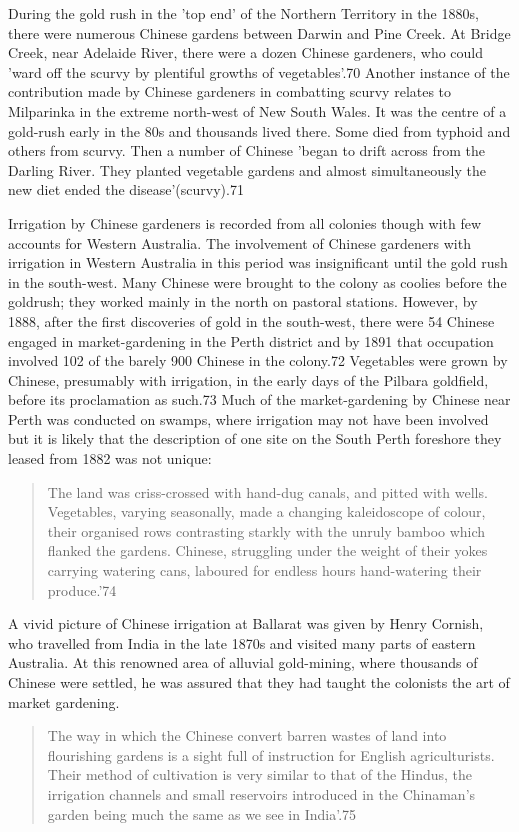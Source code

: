 During the gold rush in the 'top end' of the Northern Territory in the
1880s, there were numerous Chinese gardens between Darwin and Pine
Creek. At Bridge Creek, near Adelaide River, there were a dozen
Chinese gardeners, who could 'ward off the scurvy by plentiful growths
of vegetables'.70 Another instance of the contribution made by Chinese
gardeners in combatting scurvy relates to Milparinka in the extreme
north-west of New South Wales. It was the centre of a gold-rush early
in the 80s and thousands lived there. Some died from typhoid and
others from scurvy. Then a number of Chinese 'began to drift across
from the Darling River. They planted vegetable gardens and almost
simultaneously the new diet ended the disease'(scurvy).71

Irrigation by Chinese gardeners is recorded from all colonies though
with few accounts for Western Australia. The involvement of Chinese
gardeners with irrigation in Western Australia in this period was
insignificant until the gold rush in the south-west. Many Chinese were
brought to the colony as coolies before the goldrush; they worked
mainly in the north on pastoral stations. However, by 1888, after the
first discoveries of gold in the south-west, there were 54 Chinese
engaged in market-gardening in the Perth district and by 1891 that
occupation involved 102 of the barely 900 Chinese in the colony.72
Vegetables were grown by Chinese, presumably with irrigation, in the
early days of the Pilbara goldfield, before its proclamation as
such.73 Much of the market-gardening by Chinese near Perth was
conducted on swamps, where irrigation may not have been involved but
it is likely that the description of one site on the South Perth
foreshore they leased from 1882 was not unique:
\begin{quote}
	The land was criss-crossed with hand-dug canals, and pitted
	with wells.  Vegetables, varying seasonally, made a changing
	kaleidoscope of colour, their organised rows contrasting
	starkly with the unruly bamboo which flanked the
	gardens. Chinese, struggling under the weight of their yokes
	carrying watering cans, laboured for endless hours
	hand-watering their produce.'74
\end{quote}

A vivid picture of Chinese irrigation at Ballarat was given by Henry
Cornish, who travelled from India in the late 1870s and visited many
parts of eastern Australia. At this renowned area of alluvial
gold-mining, where thousands of Chinese were settled, he was assured
that they had taught the colonists the art of market gardening.
\begin{quote}
	The way in which the Chinese convert barren wastes of land
	into flourishing gardens is a sight full of instruction for
	English agriculturists. Their method of cultivation is very
	similar to that of the Hindus, the irrigation channels and
	small reservoirs introduced in the Chinaman's garden being
	much the same as we see in India'.75
\end{quote}

